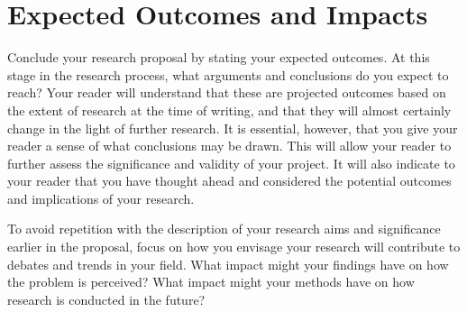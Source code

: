 \documentclass[12pt, a4paper]{article}
\begin{document}
\section{Expected Outcomes and Impacts}
Conclude your research proposal by stating your expected outcomes. At this stage in the research process, what arguments and conclusions do you expect to reach? Your reader will understand that these are projected outcomes based on the extent of research at the time of writing, and that they will almost certainly change in the light of further research. It is essential, however, that you give your reader a sense of what conclusions may be drawn. This will allow your reader to further assess the significance and validity of your project. It will also indicate to your reader that you have thought ahead and considered the potential outcomes and implications of your research.

To avoid repetition with the description of your research aims and significance earlier in the proposal, focus on how you envisage your research will contribute to debates and trends in your field. What impact might your findings have on how the problem is perceived? What impact might your methods have on how research is conducted in the future?




\end{document}
